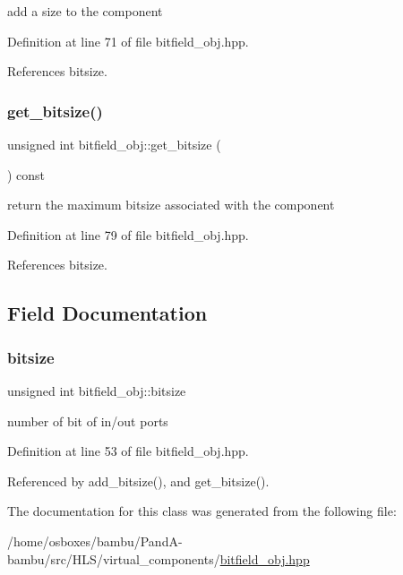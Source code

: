 add a size to the component 



Definition at line 71 of file bitfield\+\_\+obj.\+hpp.



References bitsize.

\mbox{\label{classbitfield__obj_a20e1f70d8c43a9bbaa09d15680954593}} 
\subsubsection{\texorpdfstring{get\+\_\+bitsize()}{get\_bitsize()}}
{\footnotesize\ttfamily unsigned int bitfield\+\_\+obj\+::get\+\_\+bitsize (\begin{DoxyParamCaption}{ }\end{DoxyParamCaption}) const\hspace{0.3cm}{\ttfamily [inline]}}



return the maximum bitsize associated with the component 



Definition at line 79 of file bitfield\+\_\+obj.\+hpp.



References bitsize.



\subsection{Field Documentation}
\mbox{\label{classbitfield__obj_afe152fe210b57786fd792c1dcfc9b832}} 
\subsubsection{\texorpdfstring{bitsize}{bitsize}}
{\footnotesize\ttfamily unsigned int bitfield\+\_\+obj\+::bitsize\hspace{0.3cm}{\ttfamily [private]}}



number of bit of in/out ports 



Definition at line 53 of file bitfield\+\_\+obj.\+hpp.



Referenced by add\+\_\+bitsize(), and get\+\_\+bitsize().



The documentation for this class was generated from the following file\+:\begin{DoxyCompactItemize}
\item 
/home/osboxes/bambu/\+Pand\+A-\/bambu/src/\+H\+L\+S/virtual\+\_\+components/\hyperlink{bitfield__obj_8hpp}{bitfield\+\_\+obj.\+hpp}\end{DoxyCompactItemize}
